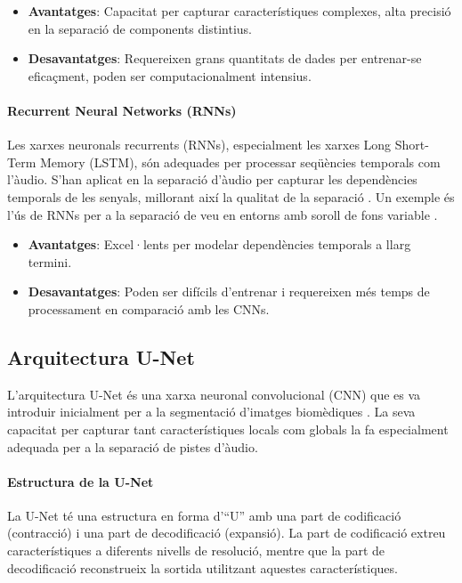 \documentclass[10pt,a4paper,twocolumn,twoside]{article}
\begin{document}
\begin{itemize}
    \item \textbf{Avantatges}: Capacitat per capturar característiques complexes, alta precisió en la separació de components distintius.
    \item \textbf{Desavantatges}: Requereixen grans quantitats de dades per entrenar-se eficaçment, poden ser computacionalment intensius.
\end{itemize}

\paragraph{Recurrent Neural Networks (RNNs)}
Les xarxes neuronals recurrents (RNNs), especialment les xarxes Long Short-Term Memory (LSTM), són adequades per processar seqüències temporals com l'àudio. S'han aplicat en la separació d'àudio per capturar les dependències temporals de les senyals, millorant així la qualitat de la separació \cite{RNN_luo2020dual}. Un exemple és l'ús de RNNs per a la separació de veu en entorns amb soroll de fons variable \cite{wang2018supervised}.

\begin{itemize}
    \item \textbf{Avantatges}: Excel·lents per modelar dependències temporals a llarg termini.
    \item \textbf{Desavantatges}: Poden ser difícils d'entrenar i requereixen més temps de processament en comparació amb les CNNs.
\end{itemize}

\subsection{Arquitectura U-Net}
L'arquitectura U-Net és una xarxa neuronal convolucional (CNN) que es va introduir inicialment per a la segmentació d'imatges biomèdiques \cite{ronneberger2015u}. La seva capacitat per capturar tant característiques locals com globals la fa especialment adequada per a la separació de pistes d'àudio.

\paragraph{Estructura de la U-Net}
La U-Net té una estructura en forma d'``U'' amb una part de codificació (contracció) i una part de decodificació (expansió). La part de codificació extreu característiques a diferents nivells de resolució, mentre que la part de decodificació reconstrueix la sortida utilitzant aquestes característiques.
\end{document}
